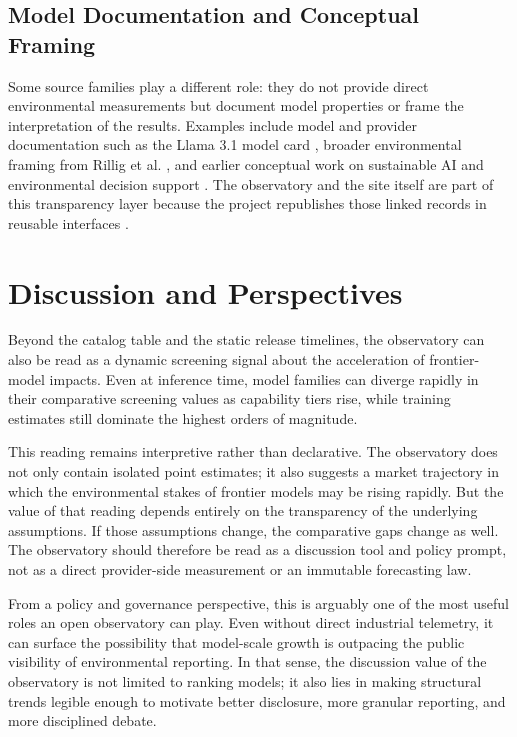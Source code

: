 \documentclass[runningheads]{llncs}
\begin{document}
\subsection{Model Documentation and Conceptual Framing}
Some source families play a different role: they do not provide direct environmental measurements but document model properties or frame the interpretation of the results. Examples include model and provider documentation such as the Llama 3.1 model card \cite{meta2024llama}, broader environmental framing from Rillig et al. \cite{rillig2023}, and earlier conceptual work on sustainable AI and environmental decision support \cite{pachot2022book,pachot2023sustainableai}. The observatory and the site itself are part of this transparency layer because the project republishes those linked records in reusable interfaces \cite{impactllmrepo2026}.

\section{Discussion and Perspectives}
Beyond the catalog table and the static release timelines, the observatory can also be read as a dynamic screening signal about the acceleration of frontier-model impacts. Even at inference time, model families can diverge rapidly in their comparative screening values as capability tiers rise, while training estimates still dominate the highest orders of magnitude.

This reading remains interpretive rather than declarative. The observatory does not only contain isolated point estimates; it also suggests a market trajectory in which the environmental stakes of frontier models may be rising rapidly. But the value of that reading depends entirely on the transparency of the underlying assumptions. If those assumptions change, the comparative gaps change as well. The observatory should therefore be read as a discussion tool and policy prompt, not as a direct provider-side measurement or an immutable forecasting law.

From a policy and governance perspective, this is arguably one of the most useful roles an open observatory can play. Even without direct industrial telemetry, it can surface the possibility that model-scale growth is outpacing the public visibility of environmental reporting. In that sense, the discussion value of the observatory is not limited to ranking models; it also lies in making structural trends legible enough to motivate better disclosure, more granular reporting, and more disciplined debate.
\end{document}
